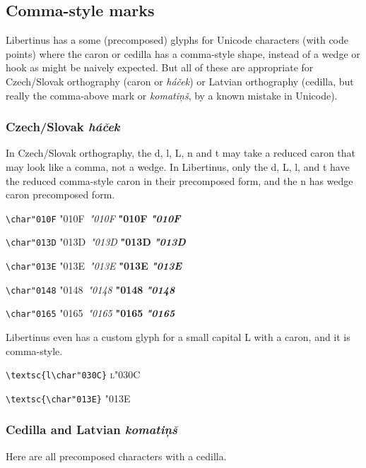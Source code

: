 \documentclass[landscape]{article}
\newcommand{\ribbiline}[1]{#1\ 
	{\itshape #1}
	{\bfseries #1}
	{\itshape\bfseries #1}}
\begin{document}
\newpage
\subsection*{Comma-style marks}

Libertinus has a some (precomposed) glyphs for Unicode characters (with code points) where 
the caron or cedilla has a comma-style shape, instead of a wedge or hook as might be naively expected.
But all of these are appropriate for Czech/Slovak orthography (caron or \textit{háček}) 
or Latvian orthography (cedilla, but really the comma-above mark or \textit{komatiņš}, 
by a known mistake in Unicode). 

\subsubsection*{Czech/Slovak \textit{háček}}

In Czech/Slovak orthography, the d, l, L, n and t may take a reduced caron that may look like a comma, not a wedge.
In Libertinus, only the d, L, l, and t have the reduced comma-style caron in their precomposed form, and the n has wedge caron precomposed form.

\verb|\char"010F| \ribbiline{\char"010F}

\verb|\char"013D| \ribbiline{\char"013D}

\verb|\char"013E| \ribbiline{\char"013E}

\verb|\char"0148| \ribbiline{\char"0148}

\verb|\char"0165| \ribbiline{\char"0165}

Libertinus even has a custom glyph for a small capital L with a caron, and it is comma-style.

\verb|\textsc{l\char"030C}| \textsc{l\char"030C}

\verb|\textsc{\char"013E}| \textsc{\char"013E}

\subsubsection*{Cedilla and Latvian \textit{komatiņš}}

Here are all precomposed characters with a cedilla.
\end{document}
